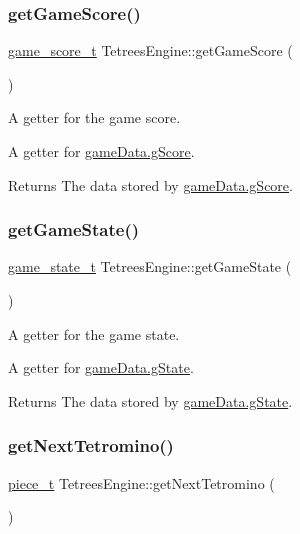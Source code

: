 \subsubsection{\texorpdfstring{get\+Game\+Score()}{getGameScore()}}
{\footnotesize\ttfamily \hyperlink{structgame__score__t}{game\+\_\+score\+\_\+t} Tetrees\+Engine\+::get\+Game\+Score (\begin{DoxyParamCaption}{ }\end{DoxyParamCaption})}



A getter for the game score. 

A getter for \hyperlink{TetreesDefs_8hpp_aebae08b2e3a36f1452b33acaf1eaab40}{game\+Data.g\+Score}. \begin{DoxyReturn}{Returns}
The data stored by \hyperlink{TetreesDefs_8hpp_aebae08b2e3a36f1452b33acaf1eaab40}{game\+Data.g\+Score}. 
\end{DoxyReturn}
\mbox{\label{classTetreesEngine_a36e231a33457f87875f19d308984b0b8}} 
\subsubsection{\texorpdfstring{get\+Game\+State()}{getGameState()}}
{\footnotesize\ttfamily \hyperlink{TetreesDefs_8hpp_aebae08b2e3a36f1452b33acaf1eaab40}{game\+\_\+state\+\_\+t} Tetrees\+Engine\+::get\+Game\+State (\begin{DoxyParamCaption}{ }\end{DoxyParamCaption})}



A getter for the game state. 

A getter for \hyperlink{TetreesDefs_8hpp_aebae08b2e3a36f1452b33acaf1eaab40}{game\+Data.g\+State}. \begin{DoxyReturn}{Returns}
The data stored by \hyperlink{TetreesDefs_8hpp_aebae08b2e3a36f1452b33acaf1eaab40}{game\+Data.g\+State}. 
\end{DoxyReturn}
\mbox{\label{classTetreesEngine_a78698174a309f2a4d74da9fd47167f56}} 
\subsubsection{\texorpdfstring{get\+Next\+Tetromino()}{getNextTetromino()}}
{\footnotesize\ttfamily \hyperlink{structpiece__t}{piece\+\_\+t} Tetrees\+Engine\+::get\+Next\+Tetromino (\begin{DoxyParamCaption}{ }\end{DoxyParamCaption})}



